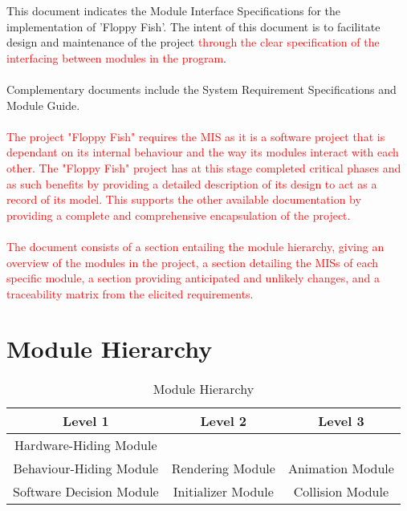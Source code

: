 \documentclass[11pt, oneside]{article}   	%
\begin{document}
This document indicates the Module Interface Specifications for the implementation
of 'Floppy Fish'. The intent of this document is to facilitate design and maintenance of the project \textcolor{red}{through the clear specification of the interfacing between modules in the program}.\\
\\
Complementary documents include the System Requirement Specifications and Module
Guide.\\
\\
\textcolor{red}{The project "Floppy Fish" requires the MIS as it is a software project that is dependant on its internal behaviour and the way its modules interact with each other. The "Floppy Fish" project has at this stage completed critical phases and as such benefits by providing a detailed description of its design to act as a record of its model. This supports the other available documentation by providing a complete and comprehensive encapsulation of the project.}\\
\\
\textcolor{red}{The document consists of a section entailing the module hierarchy, giving an overview of the modules in the project, a section detailing the MISs of each specific module, a section providing anticipated and unlikely changes, and a traceability matrix from the elicited requirements.}

\newpage
\section{Module Hierarchy}

\begin{table}[H]
\caption{Module Hierarchy}
\begin{center}
\begin{tabular}{|c|c|c|}
\hline
\textbf{Level 1} & \textbf{Level 2} & \textbf{Level 3}\\
\hline
Hardware-Hiding Module & & \\
\hline
Behaviour-Hiding Module & Rendering Module & Animation Module\\
\hline
Software Decision Module & Initializer Module & Collision Module\\
\hline
\end{tabular}
\end{center}
\label{default}
\end{table}%


\newpage
\end{document}
